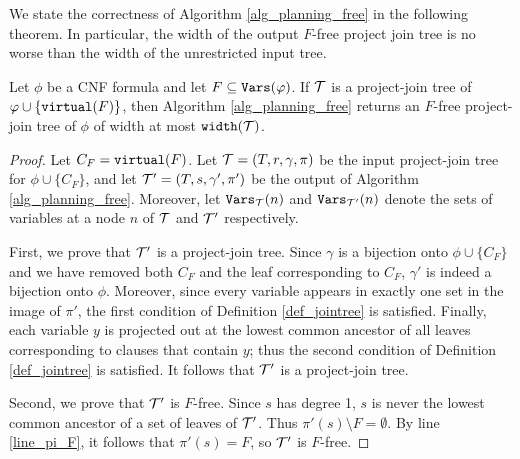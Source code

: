 We state the correctness of Algorithm \ref{alg_planning_free} in the following theorem. In particular, the width of the output $F$-free project join tree is no worse than the width of the unrestricted input tree.
\begin{theorem}\label{thm:planning_free_correctness}
Let $\phi$ be a CNF formula and let $F \subseteq \texttt{\upshape Vars}(\varphi)$. 
If $\mathcal{T}$ is a project-join tree of $\varphi \cup \{\texttt{\upshape virtual}(F)\}$, then Algorithm \ref{alg_planning_free} returns an $F$-free project-join tree of $\phi$ of width at most $\texttt{\upshape width}(\mathcal{T})$.
\end{theorem}
\begin{proof}
Let $C_F = \texttt{\upshape virtual}(F)$.
Let $\mathcal{T} = (T, r, \gamma, \pi)$ be the input project-join tree for $\phi \cup \{ C_F \}$, and let $\mathcal{T}' = (T, s, \gamma', \pi')$ be the output of Algorithm \ref{alg_planning_free}. 
Moreover, let $\texttt{\upshape Vars}_{\mathcal{T}}(n)$ and $\texttt{\upshape Vars}_{\mathcal{T}'}(n)$ denote the sets of variables at a node $n$ of $\mathcal{T}$ and $\mathcal{T}'$ respectively.


First, we prove that $\mathcal{T}'$ is a project-join tree. Since $\gamma$ is a bijection onto $\phi \cup \{C_F\}$ and we have removed both $C_F$ and the leaf corresponding to $C_F$, $\gamma'$ is indeed a bijection onto $\phi$. 
Moreover, since every variable appears in exactly one set in the image of $\pi'$, the first condition of Definition \ref{def_jointree} is satisfied. Finally, each variable $y$ is projected out at the lowest common ancestor of all leaves corresponding to clauses that contain $y$; thus the second condition of Definition \ref{def_jointree} is satisfied. It follows that $\mathcal{T}'$ is a project-join tree.

Second, we prove that $\mathcal{T}'$ is $F$-free. 
Since $s$ has degree 1, $s$ is never the lowest common ancestor of a set of leaves of $\mathcal{T}'$. Thus $\pi'(s) \setminus F = \emptyset$. By line \ref{line_pi_F}, it follows that $\pi'(s) = F$, so $\mathcal{T}'$ is $F$-free.




\end{proof}
